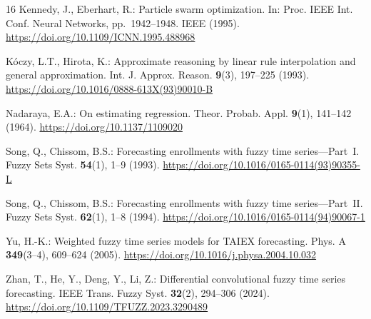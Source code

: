 \documentclass{llncs}
\begin{document}
\begin{thebibliography}{16}
Kennedy, J., Eberhart, R.: Particle swarm optimization.
In: Proc. IEEE Int. Conf. Neural Networks, pp.~1942--1948. IEEE
(1995). \url{https://doi.org/10.1109/ICNN.1995.488968}

K\'{o}czy, L.T., Hirota, K.: Approximate reasoning by linear rule
interpolation and general approximation.
Int. J. Approx. Reason. \textbf{9}(3), 197--225 (1993).
\url{https://doi.org/10.1016/0888-613X(93)90010-B}

Nadaraya, E.A.: On estimating regression.
Theor. Probab. Appl. \textbf{9}(1), 141--142 (1964).
\url{https://doi.org/10.1137/1109020}

Song, Q., Chissom, B.S.: Forecasting enrollments with fuzzy time
series---Part~I. Fuzzy Sets Syst. \textbf{54}(1), 1--9 (1993).
\url{https://doi.org/10.1016/0165-0114(93)90355-L}

Song, Q., Chissom, B.S.: Forecasting enrollments with fuzzy time
series---Part~II. Fuzzy Sets Syst. \textbf{62}(1), 1--8 (1994).
\url{https://doi.org/10.1016/0165-0114(94)90067-1}

Yu, H.-K.: Weighted fuzzy time series models for TAIEX forecasting.
Phys. A \textbf{349}(3--4), 609--624 (2005).
\url{https://doi.org/10.1016/j.physa.2004.10.032}

Zhan, T., He, Y., Deng, Y., Li, Z.: Differential convolutional fuzzy
time series forecasting. IEEE Trans. Fuzzy Syst. \textbf{32}(2),
294--306 (2024).
\url{https://doi.org/10.1109/TFUZZ.2023.3290489}

\end{thebibliography}
\end{document}
